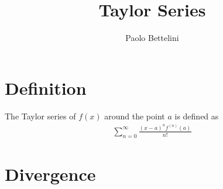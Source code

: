 \documentclass{article}
\title{Taylor Series}
\author{Paolo Bettelini}
\date{}
\begin{document}
\maketitle
\tableofcontents
\pagebreak

\section{Definition}
The Taylor series of \(f(x)\) around the point \(a\) is defined as
\begin{align*}
    \sum_{n=0}^{\infty}\frac{(x-a)^nf^{(n)}(a)}{n!}
\end{align*}

\pagebreak

\section{Divergence}
\end{document}
